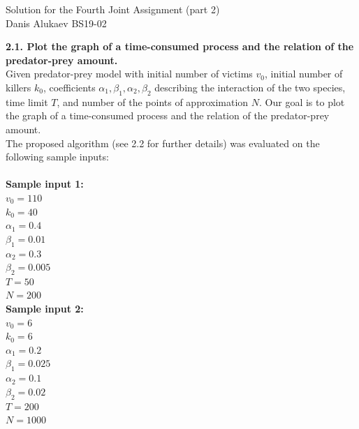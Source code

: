 \documentclass[11pt]{article}
\begin{document}
{\centering
  \large Solution for the Fourth Joint Assignment (part 2)\\
   Danis Alukaev BS19-02\\ \par
}

\bigbreak
\noindent \textbf{2.1. Plot the graph of a time-consumed process and the relation of the predator-prey amount.}\\

\noindent Given predator-prey model with initial number of victims $v_{0}$, initial number of killers $k_{0}$, coefficients $\alpha_{1},\beta_{1}, \alpha_{2},\beta_{2}$ describing the interaction of the two species, time limit $T$, and number of the points of approximation $N$. Our goal is to plot the graph of a time-consumed process and the relation of the predator-prey amount.\\




\noindent The proposed algorithm (see 2.2 for further details) was evaluated on the following sample inputs:\\ 
\\
\textbf{Sample input 1:}\\
$v_{0}=110$\\
$k_{0}=40$\\
$\alpha_{1}=0.4$\\
$\beta_{1}=0.01$\\
$\alpha_{2}=0.3$\\
$\beta_{2}=0.005$\\
$T=50$\\
$N=200$\\

\noindent
\textbf{Sample input 2:}\\
$v_{0}=6$\\
$k_{0}=6$\\
$\alpha_{1}=0.2$\\
$\beta_{1}=0.025$\\
$\alpha_{2}=0.1$\\
$\beta_{2}=0.02$\\
$T=200$\\
$N=1000$\\
\end{document}
